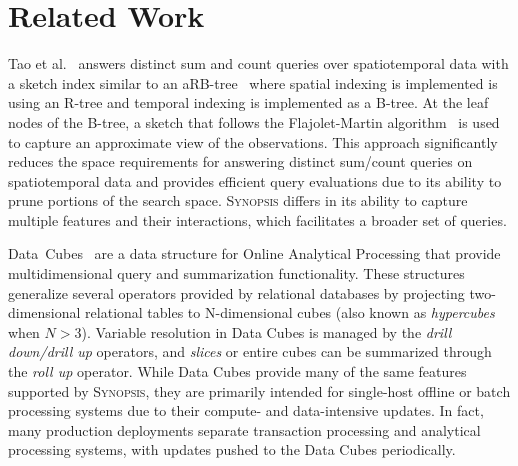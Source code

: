\documentclass[9pt,journal,compsoc]{IEEEtran}
\begin{document}
\section{Related Work}
\label{sec:related}
Tao et al.~\cite{tao2004spatio} answers distinct sum and count queries over spatiotemporal data with a sketch index similar to an aRB-tree~\cite{papadias2002indexing} where spatial indexing is implemented is using an R-tree and temporal indexing is implemented as a B-tree.  At the leaf nodes of the B-tree, a sketch that follows the Flajolet-Martin algorithm~\cite{flajolet1985probabilistic} is used to capture an approximate view of the observations.
This approach significantly reduces the space requirements for answering distinct sum/count queries on spatiotemporal data and provides efficient query evaluations due to its ability to prune portions of the search space.
\textsc{Synopsis} differs in its ability to capture multiple features and their interactions, which facilitates a broader set of queries.

Data~Cubes~\cite{gray1996data,harinarayan1996implementing,mumick1997maintenance,ho1997range} are a data structure for Online Analytical Processing that provide multidimensional query and summarization functionality. These structures generalize several operators provided by relational databases by projecting two-dimensional relational tables to N-dimensional cubes (also known as \emph{hypercubes} when $N > 3$). Variable resolution in Data Cubes is managed by the \emph{drill down/drill up} operators, and \emph{slices} or entire cubes can be summarized through the \emph{roll up} operator. While Data Cubes provide many of the same features supported by \textsc{Synopsis}, they are primarily intended for single-host offline or batch processing systems due to their compute- and data-intensive updates. In fact, many production deployments separate transaction processing and analytical processing systems, with updates pushed to the Data Cubes periodically. 

\end{document}
